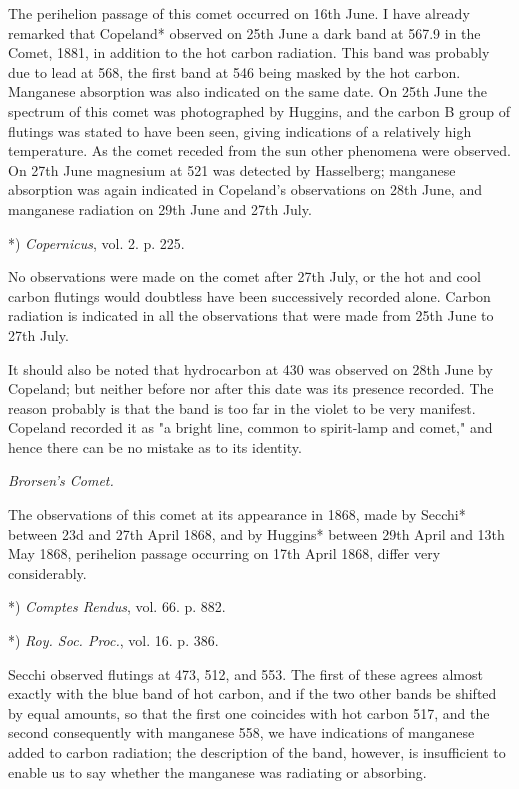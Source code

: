 \documentclass[a4paper, 12pt, oneside, polutonikogreek, english]{article}
\begin{document}
The perihelion passage of this comet occurred on 16th June. I have already remarked that Copeland* observed on 25th June a dark band at 567.9 in the Comet, 1881, in addition to the hot carbon radiation. This band was probably due to lead at 568, the first band at 546 being masked by the hot carbon. Manganese absorption was also indicated on the same date. On 25th June the spectrum of this comet was photographed by Huggins, and the carbon B group of flutings was stated to have been seen, giving indications of a relatively high temperature. As the comet receded from the sun other phenomena were observed. On 27th June magnesium at 521 was detected by Hasselberg; manganese absorption was again indicated in Copeland's observations on 28th June, and manganese radiation on 29th June and 27th July.

*) \emph{Copernicus}, vol. 2. p. 225.

No observations were made on the comet after 27th July, or the hot and cool carbon flutings would doubtless have been successively recorded alone. Carbon radiation is indicated in all the observations that were made from 25th June to 27th July.

It should also be noted that hydrocarbon at 430 was observed on 28th June by Copeland; but neither before nor after this date was its presence recorded. The reason probably is that the band is too far in the violet to be very manifest. Copeland recorded it as "a bright line, common to spirit-lamp and comet," and hence there can be no mistake as to its identity.

\emph{Brorsen's Comet.}

The observations of this comet at its appearance in 1868, made by Secchi* between 23d and 27th April 1868, and by Huggins* between 29th April and 13th May 1868, perihelion passage occurring on 17th April 1868, differ very considerably.

*) \emph{Comptes Rendus}, vol. 66. p. 882.

*) \emph{Roy. Soc. Proc.}, vol. 16. p. 386.

Secchi observed flutings at 473, 512, and 553. The first of these agrees almost exactly with the blue band of hot carbon, and if the two other bands be shifted by equal amounts, so that the first one coincides with hot carbon 517, and the second consequently with manganese 558, we have indications of manganese added to carbon radiation; the description of the band, however, is insufficient to enable us to say whether the manganese was radiating or absorbing.
\end{document}
